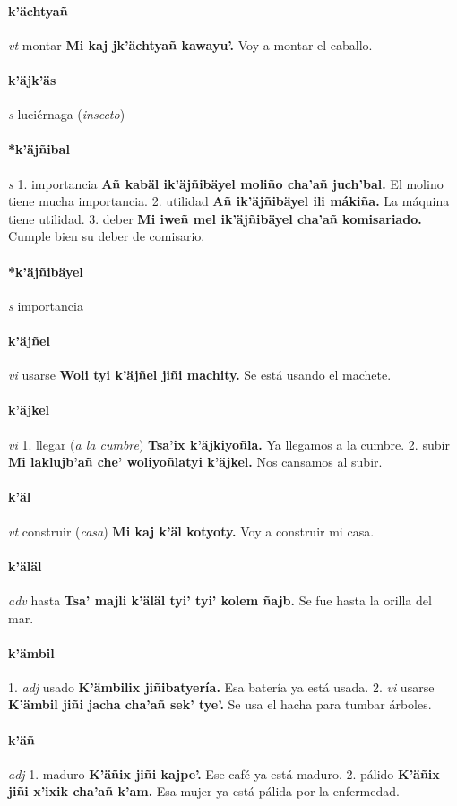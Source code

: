 \documentclass{scrbook}
\newcommand{\entry}[1]{\paragraph{#1}}
\newcommand{\onedefinition}[1]{#1.}
\newcommand{\partofspeech}[1]{\textit{#1}}
\newcommand{\spanishtranslation}[1]{#1}
\newcommand{\clarification}[1]{(\textit{#1})}
\newcommand{\cholexample}[1]{\textbf{#1}}
\newcommand{\exampletranslation}[1]{#1}
\begin{document}
\begin{multicols}{2}
\entry{k'ächtyañ}
\partofspeech{vt}
\spanishtranslation{montar}
\cholexample{Mi kaj jk'ächtyañ kawayu'.}
\exampletranslation{Voy a montar el caballo.}

\entry{k'äjk'äs}
\partofspeech{s}
\spanishtranslation{luciérnaga}
\clarification{insecto}

\entry{*k'äjñibal}
\partofspeech{s}
\onedefinition{1}
\spanishtranslation{importancia}
\cholexample{Añ kabäl ik'äjñibäyel moliño cha'añ juch'bal.}
\exampletranslation{El molino tiene mucha importancia.}
\onedefinition{2}
\spanishtranslation{utilidad}
\cholexample{Añ ik'äjñibäyel ili mákiña.}
\exampletranslation{La máquina tiene utilidad.}
\onedefinition{3}
\spanishtranslation{deber}
\cholexample{Mi iweñ mel ik'äjñibäyel cha'añ komisariado.}
\exampletranslation{Cumple bien su deber de comisario.}

\entry{*k'äjñibäyel}
\partofspeech{s}
\spanishtranslation{importancia}

\entry{k'äjñel}
\partofspeech{vi}
\spanishtranslation{usarse}
\cholexample{Woli tyi k'äjñel jiñi machity.}
\exampletranslation{Se está usando el machete.}

\entry{k'äjkel}
\partofspeech{vi}
\onedefinition{1}
\spanishtranslation{llegar}
\clarification{a la cumbre}
\cholexample{Tsa'ix k'äjkiyoñla.}
\exampletranslation{Ya llegamos a la cumbre.}
\onedefinition{2}
\spanishtranslation{subir}
\cholexample{Mi laklujb'añ che' woliyoñlatyi k'äjkel.}
\exampletranslation{Nos cansamos al subir.}

\entry{k'äl}
\partofspeech{vt}
\spanishtranslation{construir}
\clarification{casa}
\cholexample{Mi kaj k'äl kotyoty.}
\exampletranslation{Voy a construir mi casa.}

\entry{k'äläl}
\partofspeech{adv}
\spanishtranslation{hasta}
\cholexample{Tsa' majli k'äläl tyi' tyi' kolem ñajb.}
\exampletranslation{Se fue hasta la orilla del mar.}

\entry{k'ämbil}
\onedefinition{1}
\partofspeech{adj}
\spanishtranslation{usado}
\cholexample{K'ämbilix jiñibatyería.}
\exampletranslation{Esa batería ya está usada.}
\onedefinition{2}
\partofspeech{vi}
\spanishtranslation{usarse}
\cholexample{K'ämbil jiñi jacha cha'añ sek' tye'.}
\exampletranslation{Se usa el hacha para tumbar árboles.}

\entry{k'äñ}
\partofspeech{adj}
\onedefinition{1}
\spanishtranslation{maduro}
\cholexample{K'äñix jiñi kajpe'.}
\exampletranslation{Ese café ya está maduro.}
\onedefinition{2}
\spanishtranslation{pálido}
\cholexample{K'äñix jiñi x'ixik cha'añ k'am.}
\exampletranslation{Esa mujer ya está pálida por la enfermedad.}


\end{multicols}
\end{document}

